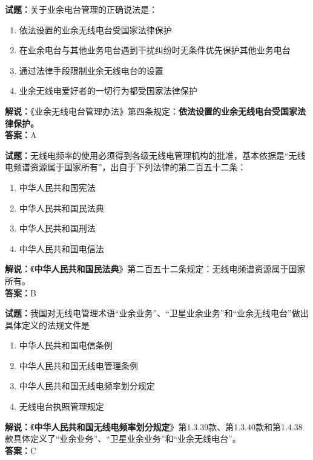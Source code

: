 \documentclass{ctexbook}
\begin{document}
\noindent\textbf{试题：}关于业余电台管理的正确说法是：

\begin{enumerate}[leftmargin=3em]
  \item 依法设置的业余无线电台受国家法律保护
  \item 在业余电台与其他业务电台遇到干扰纠纷时无条件优先保护其他业务电台
  \item 通过法律手段限制业余无线电台的设置
  \item 业余无线电爱好者的一切行为都受国家法律保护
\end{enumerate}

\noindent\textbf{解说：}《业余无线电台管理办法》第四条规定：\textbf{依法设置的业余无线电台受国家法律保护。}\\\noindent\textbf{答案：}A

\vspace{\baselineskip}

\noindent\textbf{试题：}无线电频率的使用必须得到各级无线电管理机构的批准，基本依据是“无线电频谱资源属于国家所有”，出自于下列法律的第二百五十二条：

\begin{enumerate}[leftmargin=3em]
  \item 中华人民共和国宪法
  \item 中华人民共和国民法典
  \item 中华人民共和国刑法
  \item 中华人民共和国电信法
\end{enumerate}

\noindent\textbf{解说：}《\textbf{中华人民共和国民法典}》第二百五十二条规定：无线电频谱资源属于国家所有。\\
\noindent\textbf{答案：}B

\vspace{\baselineskip}

\noindent\textbf{试题：}我国对无线电管理术语“业余业务”、“卫星业余业务”和“业余无线电台”做出具体定义的法规文件是
\begin{enumerate}[leftmargin=3em]
  \item 中华人民共和国电信条例
  \item 中华人民共和国无线电管理条例
  \item 中华人民共和国无线电频率划分规定
  \item 无线电台执照管理规定
\end{enumerate}
\textbf{解说：}《\textbf{中华人民共和国无线电频率划分规定}》第1.3.39款、第1.3.40款和第1.4.38款具体定义了“业余业务”、“卫星业余业务”和“业余无线电台”。\\\noindent\textbf{答案：}C
\end{document}
